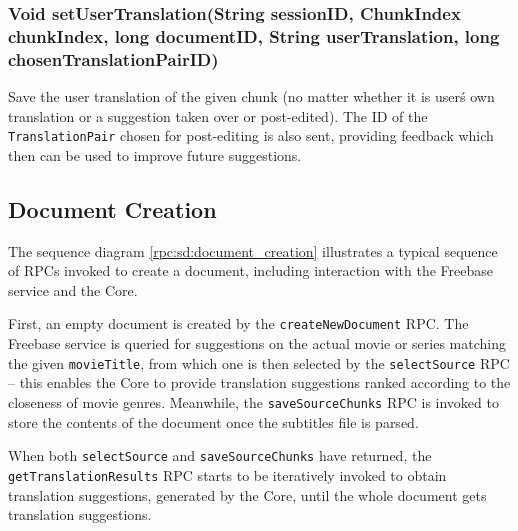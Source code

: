 {\subsubsection{Void setUserTranslation(String sessionID, ChunkIndex chunkIndex, long documentID, String userTranslation, long chosenTranslationPairID)}
Save the user translation of the given chunk (no matter whether it is user\'s own translation or a suggestion taken over or post-edited).
The ID of the {\tt TranslationPair} chosen for post-editing is also sent, providing feedback which then can be used to improve future suggestions.

\subsection{Document Creation}

The sequence diagram \ref{rpc:sd:document_creation} illustrates a typical sequence of RPCs invoked to create a document, including interaction with the Freebase service and the Core.

First, an empty document is created by the {\tt createNewDocument} RPC. The Freebase service is queried for suggestions on the actual movie or series matching the given {\tt movieTitle}, from which one is then selected by the {\tt selectSource} RPC -- this enables the Core to provide translation suggestions ranked according to the closeness of movie genres. Meanwhile, the {\tt saveSourceChunks} RPC is invoked to store the contents of the document once the subtitles file is parsed.

When both {\tt selectSource} and {\tt saveSourceChunks} have returned, the {\tt getTranslationResults} RPC starts to be iteratively invoked to obtain translation suggestions, generated by the Core, until the whole document gets translation suggestions.

}
